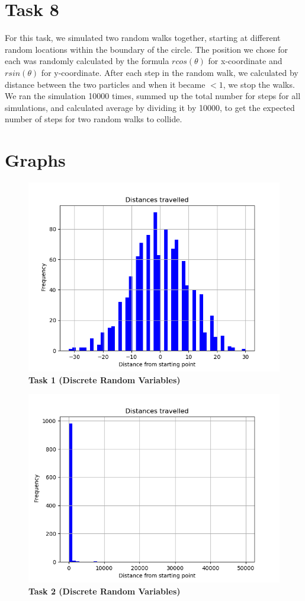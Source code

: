 \documentclass{article}
\begin{document}
    \section*{Task 8}
    For this task, we simulated two random walks together, starting at different random locations within the boundary of the circle. The position we chose for each was randomly calculated by the formula $rcos(\theta)$ for x-coordinate
     and $rsin(\theta)$ for y-coordinate. After each step in the random walk, we calculated by distance between the two particles and when it became $< 1$, we stop the walks. We ran the simulation 10000 times, summed up the total number for steps for all simulations,
     and calculated average by dividing it by 10000, to get the expected number of steps for two random walks to collide.
    \section*{Graphs}
    \begin{figure}[H]
        \includegraphics[width=15cm]{Graphs/task1.png}
        \centering
        \caption{\textbf{Task 1 (Discrete Random Variables)}}
    \end{figure}
    \begin{figure}[H]
        \includegraphics[width=15cm]{Graphs/task2.png}
        \centering
        \caption{\textbf{Task 2 (Discrete Random Variables)}}
    \end{figure}
\end{document}
